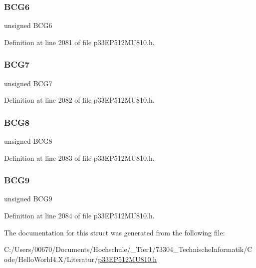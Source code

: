 \subsubsection{\texorpdfstring{B\+C\+G6}{BCG6}}
{\footnotesize\ttfamily unsigned B\+C\+G6}



Definition at line 2081 of file p33\+E\+P512\+M\+U810.\+h.

\mbox{\label{structtag_d_c_i_c_o_n3_b_i_t_s_a76552cb4c974bcc578d8b334cef0a7a6}} 
\subsubsection{\texorpdfstring{B\+C\+G7}{BCG7}}
{\footnotesize\ttfamily unsigned B\+C\+G7}



Definition at line 2082 of file p33\+E\+P512\+M\+U810.\+h.

\mbox{\label{structtag_d_c_i_c_o_n3_b_i_t_s_a92116043f0d6f8a7eb1a591e5afd6191}} 
\subsubsection{\texorpdfstring{B\+C\+G8}{BCG8}}
{\footnotesize\ttfamily unsigned B\+C\+G8}



Definition at line 2083 of file p33\+E\+P512\+M\+U810.\+h.

\mbox{\label{structtag_d_c_i_c_o_n3_b_i_t_s_ab32763fdafe3f3afb6abf23bab9c19db}} 
\subsubsection{\texorpdfstring{B\+C\+G9}{BCG9}}
{\footnotesize\ttfamily unsigned B\+C\+G9}



Definition at line 2084 of file p33\+E\+P512\+M\+U810.\+h.



The documentation for this struct was generated from the following file\+:\begin{DoxyCompactItemize}
\item 
C\+:/\+Users/00670/\+Documents/\+Hochschule/\+\_\+\+Tier1/73304\+\_\+\+Technische\+Informatik/\+Code/\+Hello\+World4.\+X/\+Literatur/\hyperlink{p33_e_p512_m_u810_8h}{p33\+E\+P512\+M\+U810.\+h}\end{DoxyCompactItemize}
